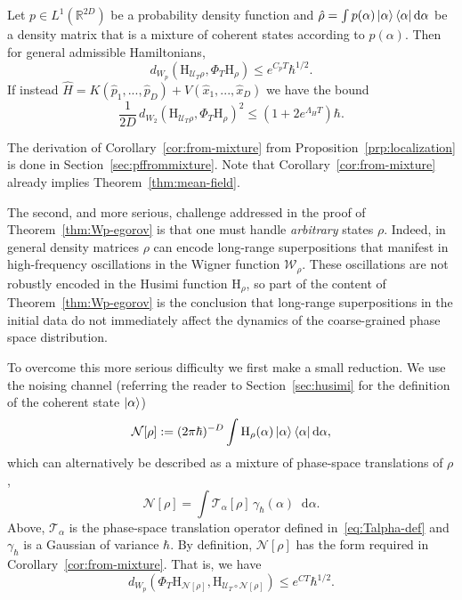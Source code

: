 \documentclass[11pt]{amsart}
\def\Wigner{{\mathcal W}}
\def\Husimi{{\mathrm{H}}}
\def\Real{{\mathbb R}}
\newcommand{\diff}{\mathop{}\!\mathrm{d}}
\newcommand{\mcal}[1]{{\mathcal{#1}}}
\def\bra#1{\mathinner{\langle{#1}|}}
\def\ket#1{\mathinner{|{#1}\rangle}}
\numberwithin{equation}{section}
\begin{document}
\begin{corollary}
\label{cor:from-mixture}
Let $p\in L^1(\Real^{2D})$ be a probability density function and
$\hat{\rho} = \int p(\alpha) \ket{\alpha}\bra{\alpha}\diff\alpha$ be a density matrix that is a mixture of coherent states according to $p(\alpha)$.
Then for general admissible Hamiltonians,
\begin{equation}
\label{eq:mixture-general}
d_{W_p}(\Husimi_{\mcal{U}_T\rho}, \Phi_T \Husimi_{\rho}) \leq e^{C_pT} \hbar^{1/2}.
\end{equation}
If instead $\hat{H}=K(\hat{p}_1,...,\hat{p}_D) + V(\hat{x}_1,...,\hat{x}_D)$ we have the bound
\begin{equation}
\label{eq:mixture-meanfield}
\frac{1}{2D}\, d_{W_2}(\Husimi_{\mcal{U}_T\rho}, \Phi_T \Husimi_{\rho})^2 \leq (1 + 2 e^{\Lambda_HT}) \hbar.
\end{equation}
\end{corollary}
The derivation of Corollary~\ref{cor:from-mixture} from Proposition~\ref{prp:localization} is done
in Section~\ref{sec:pffrommixture}.  Note that Corollary~\ref{cor:from-mixture} already implies Theorem~\ref{thm:mean-field}.

The second, and more serious, challenge addressed in the proof of Theorem~\ref{thm:Wp-egorov} is that one must handle
\textit{arbitrary} states $\rho$.  Indeed, in general density matrices $\rho$ can encode long-range superpositions that manifest in
high-frequency oscillations in the Wigner function $\Wigner_\rho$.  These oscillations are not robustly encoded in the Husimi function $\Husimi_\rho$, so part of the content of Theorem~\ref{thm:Wp-egorov} is the conclusion that long-range superpositions in the initial data do not immediately affect the dynamics of the coarse-grained phase
space distribution.

To overcome this more serious difficulty we first make a small reduction.  We use the noising channel
(referring the reader to Section~\ref{sec:husimi} for the definition of the coherent state $\ket{\alpha}$)
\begin{align}
\label{E:noisesuper1}
\mcal{N}[\rho] := (2\pi\hbar)^{-D} \int \Husimi_\rho(\alpha) \ket{\alpha}\bra{\alpha}\diff \alpha,
\end{align}
which can alternatively be described as a mixture of phase-space translations of $\rho$,
\begin{equation}
\label{eq:translation-mixture}
\mcal{N}[\rho] = \int \mcal{T}_\alpha[\rho]  \,\gamma_\hbar(\alpha)\diff \alpha.
\end{equation}
Above, $\mcal{T}_\alpha$ is the phase-space translation operator defined in~\eqref{eq:Talpha-def} and $\gamma_\hbar$ is a Gaussian of variance $\hbar$.
By definition, $\mcal{N}[\rho]$ has the form required in Corollary~\ref{cor:from-mixture}.  That is, we have
\[
d_{W_p}(\Phi_T \Husimi_{\mcal{N}[\rho]}, \Husimi_{\mcal{U}_T \circ \mcal{N}[\rho]}) \leq e^{CT} \hbar^{1/2}.
\]
\end{document}
